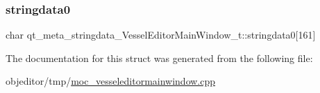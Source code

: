 \subsubsection{\texorpdfstring{stringdata0}{stringdata0}}
{\footnotesize\ttfamily char qt\+\_\+meta\+\_\+stringdata\+\_\+\+Vessel\+Editor\+Main\+Window\+\_\+t\+::stringdata0\mbox{[}161\mbox{]}}



The documentation for this struct was generated from the following file\+:\begin{DoxyCompactItemize}
\item 
objeditor/tmp/\mbox{\hyperlink{moc__vesseleditormainwindow_8cpp}{moc\+\_\+vesseleditormainwindow.\+cpp}}\end{DoxyCompactItemize}
